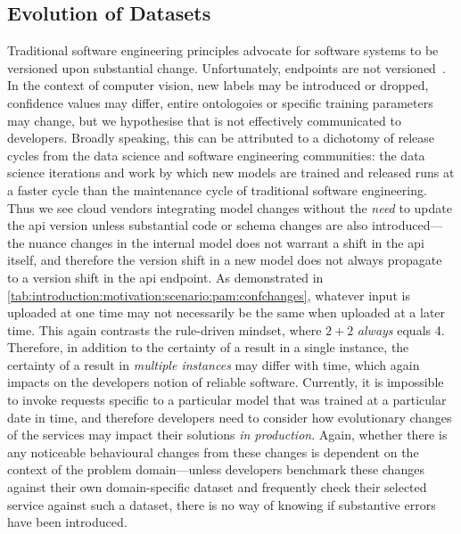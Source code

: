 \subsection{Evolution of Datasets}
Traditional software engineering principles advocate for software systems to be versioned upon substantial change. Unfortunately, endpoints are not versioned~\citep{Cummaudo:2019icsme}. In the context of computer vision, new labels may be introduced or dropped, confidence values may differ, entire ontologoies or specific training parameters may change, but we hypothesise that is not effectively communicated to developers. Broadly speaking, this can be attributed to a dichotomy of release cycles from the data science and software engineering communities: the data science iterations and work by which new models are trained and released runs at a faster cycle than the maintenance cycle of traditional software engineering. Thus we see cloud vendors integrating model changes without the \textit{need} to update the \gls{api} version unless substantial code or schema changes are also introduced---the nuance changes in the internal model does not warrant a shift in the \gls{api} itself, and therefore the version shift in a new model does not always propagate to a version shift in the \gls{api} endpoint.
As demonstrated in \cref{tab:introduction:motivation:scenario:pam:confchanges}, whatever input is uploaded at one time may not necessarily be the same when uploaded at a later time. This again contrasts the rule-driven mindset, where $2+2$ \textit{always} equals 4. Therefore, in addition to the certainty of a result in a single instance, the certainty of a result in \textit{multiple instances} may differ with time, which again impacts on the developers notion of reliable software.
Currently, it is impossible to invoke requests specific to a particular model that was trained at a particular date in time, and therefore developers need to consider how evolutionary changes of the services may impact their solutions \textit{in production}. Again, whether there is any noticeable behavioural changes from these changes is dependent on the context of the problem domain---unless developers benchmark these changes against their own domain-specific dataset and frequently check their selected service against such a dataset, there is no way of knowing if substantive errors have been introduced.

